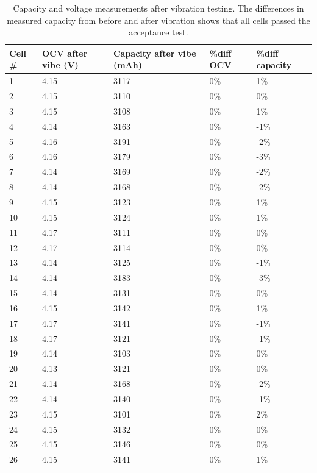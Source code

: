 \documentclass{article}
\begin{document}
\begin{table}[H]
    \centering
    \caption{Capacity and voltage measurements after vibration testing. The differences in measured capacity from before and after vibration shows that all cells passed the acceptance test.}
    \begin{tabular}{lllll}
        \textbf{Cell \#} & \textbf{OCV after vibe (V)} & \textbf{Capacity after vibe (mAh)} & \textbf{\%diff OCV} & \textbf{\%diff capacity} \\ \hline
        1 & 4.15 & 3117 & 0\% & 1\% \\ 
        2 & 4.15 & 3110 & 0\% & 0\% \\ 
        3 & 4.15 & 3108 & 0\% & 1\% \\ 
        4 & 4.14 & 3163 & 0\% & -1\% \\ 
        5 & 4.16 & 3191 & 0\% & -2\% \\ 
        6 & 4.16 & 3179 & 0\% & -3\% \\ 
        7 & 4.14 & 3169 & 0\% & -2\% \\ 
        8 & 4.14 & 3168 & 0\% & -2\% \\ 
        9 & 4.15 & 3123 & 0\% & 1\% \\ 
        10 & 4.15 & 3124 & 0\% & 1\% \\ 
        11 & 4.17 & 3111 & 0\% & 0\% \\ 
        12 & 4.17 & 3114 & 0\% & 0\% \\ 
        13 & 4.14 & 3125 & 0\% & -1\% \\ 
        14 & 4.14 & 3183 & 0\% & -3\% \\ 
        15 & 4.14 & 3131 & 0\% & 0\% \\ 
        16 & 4.15 & 3142 & 0\% & 1\% \\ 
        17 & 4.17 & 3141 & 0\% & -1\% \\ 
        18 & 4.17 & 3121 & 0\% & -1\% \\ 
        19 & 4.14 & 3103 & 0\% & 0\% \\ 
        20 & 4.13 & 3121 & 0\% & 0\% \\ 
        21 & 4.14 & 3168 & 0\% & -2\% \\ 
        22 & 4.14 & 3140 & 0\% & -1\% \\ 
        23 & 4.15 & 3101 & 0\% & 2\% \\ 
        24 & 4.15 & 3132 & 0\% & 0\% \\ 
        25 & 4.15 & 3146 & 0\% & 0\% \\ 
        26 & 4.15 & 3141 & 0\% & 1\% \\ 

\end{tabular}
\end{table}
\end{document}
